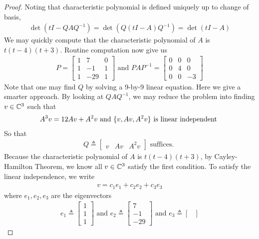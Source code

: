 \documentclass{report}
\begin{document}
\begin{proof}
Noting that characteristic polynomial is defined uniquely up to change of basis, 
\begin{align*}
\operatorname{det}(tI- QAQ^{-1})=\operatorname{det}(Q(tI-A)Q^{-1})= \operatorname{det}(tI-A)
\end{align*}
We may quickly compute that the characteristic polynomial of $A$ is $t(t-4)(t+3)$. Routine computation now give us 
\begin{align*}
P=\begin{bmatrix}
  1 & 7 & 0 \\
  1 & -1 & 1 \\
  1 & -29 & 1
\end{bmatrix} \text{ and }PAP^{-1}=\begin{bmatrix}
  0 & 0 & 0 \\
  0 & 4 & 0 \\
  0 & 0 & -3 
\end{bmatrix}
\end{align*}
Note that one may find $Q$ by solving a  9-by-9 linear equation. Here we give a smarter approach.  By looking at $QAQ^{-1}$, we may reduce the problem into finding $v\in\mathbb{C}^3$ such that 
\begin{align*}
A^3v= 12Av+A^2v \text{ and }\{ v,Av,A^2v \}\text{ is linear independent }
\end{align*}
So that 
\begin{align*}
Q\triangleq \begin{bmatrix}
  v & Av & A^2v
\end{bmatrix}\text{ suffices. }
\end{align*}
Because the characteristic polynomial of $A$ is  $t(t-4)(t+3)$, by Cayley-Hamilton Theorem, we know all $v\in\mathbb{C}^3$ satisfy the first condition.  To satisfy the linear independence, we  write 
\begin{align*}
v= c_1e_1+c_2e_2+c_3e_3
\end{align*}
where $e_1,e_2,e_3$ are the eigenvectors
 \begin{align*}
e_1\triangleq \begin{bmatrix}
  1 \\
  1 \\
  1 
\end{bmatrix} \text{ and } e_2 \triangleq  \begin{bmatrix}
7 \\
-1 \\
-29
\end{bmatrix} \text{ and }e_3\triangleq \begin{bmatrix}

\end{bmatrix}
\end{align*}
\end{proof}
\end{document}
